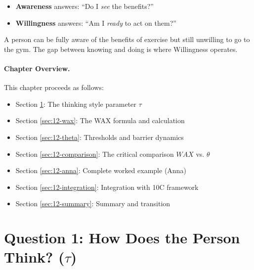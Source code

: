 \begin{intuition}
\begin{itemize}[nosep]
\item \textbf{Awareness} answers: ``Do I \textit{see} the benefits?''
\item \textbf{Willingness} answers: ``Am I \textit{ready} to act on them?''
\end{itemize}
A person can be fully aware of the benefits of exercise but still unwilling to
go to the gym. The gap between knowing and doing is where Willingness operates.
\end{intuition}

\paragraph{Chapter Overview.}
This chapter proceeds as follows:
\begin{itemize}
    \item Section \ref{sec:12-tau}: The thinking style parameter $\tau$
    \item Section \ref{sec:12-wax}: The WAX formula and calculation
    \item Section \ref{sec:12-theta}: Thresholds and barrier dynamics
    \item Section \ref{sec:12-comparison}: The critical comparison $WAX$ vs. $\theta$
    \item Section \ref{sec:12-anna}: Complete worked example (Anna)
    \item Section \ref{sec:12-integration}: Integration with 10C framework
    \item Section \ref{sec:12-summary}: Summary and transition
\end{itemize}



\section{Question 1: How Does the Person Think? ($\tau$)}
\label{sec:12-tau}



